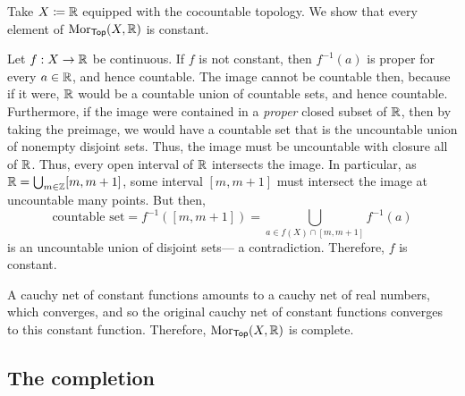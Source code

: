 \begin{exm}
Take $X\coloneqq \mathbb{R}$ equipped with the cocountable topology.  We show that every element of $\operatorname{Mor} _{\mathsf{Top}}(X,\mathbb{R} )$ is constant.

Let $f:X\rightarrow \mathbb{R}$ be continuous.  If $f$ is not constant, then $f^{-1}(a)$ is proper for every $a\in \mathbb{R}$, and hence countable.  The image cannot be countable then, because if it were, $\mathbb{R}$ would be a countable union of countable sets, and hence countable.  Furthermore, if the image were contained in a \emph{proper} closed subset of $\mathbb{R}$, then by taking the preimage, we would have a countable set that is the uncountable union of nonempty disjoint sets.  Thus, the image must be uncountable with closure all of $\mathbb{R}$.  Thus, every open interval of $\mathbb{R}$ intersects the image.  In particular, as $\mathbb{R} =\bigcup _{m\in \mathbb{Z}}[m,m+1]$, some interval $[m,m+1]$ must intersect the image at uncountable many points.  But then,
\begin{equation}
\text{countable set}=f^{-1}([m,m+1])=\bigcup _{a\in f(X)\cap [m,m+1]}f^{-1}(a)
\end{equation}
is an uncountable union of disjoint sets--- a contradiction.  Therefore, $f$ is constant.

A cauchy net of constant functions amounts to a cauchy net of real numbers, which converges, and so the original cauchy net of constant functions converges to this constant function.  Therefore, $\operatorname{Mor} _{\mathsf{Top}}(X,\mathbb{R} )$ is complete.
\end{exm}

\subsection{The completion}

